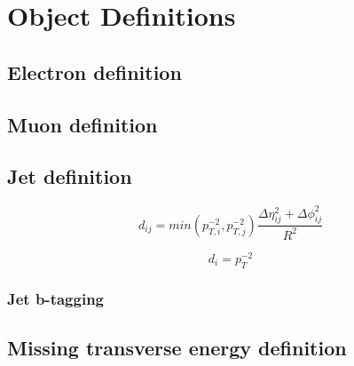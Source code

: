 \chapter{Object Definitions}
\label{SECTION-OBJ}


\section{Electron definition}
\label{SECTION-OBJ-EL}


\section{Muon definition}
\label{SECTION-OBJ-MU}


\section{Jet definition}
\label{SECTION-OBJ-JET}

\begin{equation}
\label{EQ-OBJ-ANTIKT}
d_{ij} = min(p^{-2}_{T,i},p^{-2}_{T,j})\frac{\Delta\eta^{2}_{ij}+\Delta\phi^{2}_{ij}}{R^{2}}
\end{equation}

\begin{equation}
\label{EQ-OBJ-ANTIKTBEAM}
d_{i} = p^{-2}_{T}
\end{equation}


\subsection{Jet b-tagging}
\label{SECTION-OBJ-JET-BTAG}


\section{Missing transverse energy definition}
\label{SECTION-OBJ-MET}
